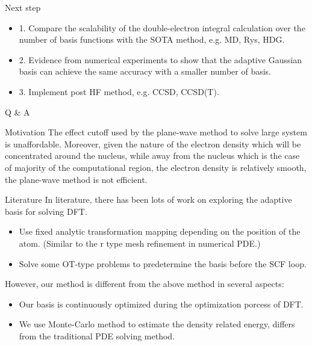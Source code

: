 \documentclass[paper slide]{beamer}
\begin{document}
\begin{frame}{Next step}
	\begin{itemize}
		\item 1. Compare the scalability of the double-electron integral
		calculation over the number of basis functions with the SOTA method, e.g.
		MD, Rys, HDG.
		\item 2. Evidence from numerical experiments to show that the adaptive
		Gaussian basis can achieve the same accuracy with a smaller number of
		basis.
		\item 3. Implement post HF method, e.g. CCSD, CCSD(T).
	\end{itemize}
\end{frame}

\begin{frame}
	Q \& A
\end{frame}

\begin{frame}{Motivation}
	The effect cutoff used by the plane-wave method to solve large system is
	unaffordable. Moreover, given the nature of the electron density which will
	be concentrated around the nucleus, while away from the nucleus which is the
	case of majority of the computational region, the electron density is
	relatively smooth, the plane-wave method is not efficient.

\end{frame}

\begin{frame}{Literature}
	In literature, there has been lots of work on exploring the adaptive basis for
	solving DFT. 
	\begin{itemize}
		\item Use fixed analytic transformation mapping depending on the position of the
		atom. (Similar to the r type mesh refinement in numerical PDE.)
		\item Solve some OT-type problems to predetermine the basis before the SCF
		loop.
	\end{itemize}
	However, our method is different from the above method in several aspects:
	\begin{itemize}
		\item Our basis is continuously optimized during the optimization porcess of
		DFT.
		\item We use Monte-Carlo method to estimate the density related energy,
		differs from the traditional PDE solving method.
	\end{itemize}
\end{frame}
\end{document}
